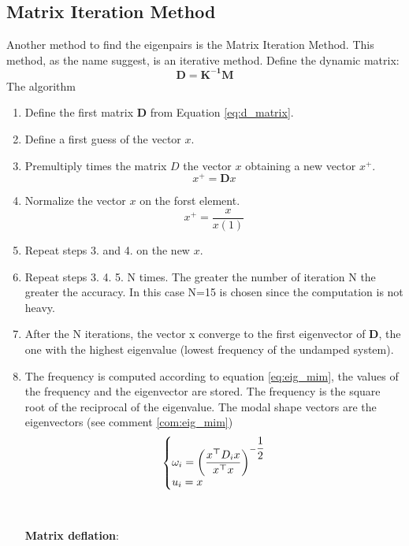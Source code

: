 \documentclass[twosided,a4paper]{article}           %
\makeatletter
\newcounter{comment}[section]
\newcommand{\tr}{^{{\bm \top}}}
\newenvironment{sistema}%
{\left\lbrace\begin{array}{@{}l@{}}}%
	{\end{array}\right.}
\makeatother
\begin{document}
\subsection{Matrix Iteration Method}
	Another method to find the eigenpairs is the Matrix Iteration Method. This method, as the name suggest, is an iterative method.
	Define the dynamic matrix:
	\begin{equation}
	    \label{eq:d_matrix}
		\bm{D} = \bm{K^{-1}}\bm{M}
	\end{equation}
	The algorithm
	\begin{enumerate}
		\item Define the first matrix $\bm{D}$ from Equation \eqref{eq:d_matrix}.
		\item Define a first guess of the vector $x$.
		\item Premultiply times the matrix $D$ the vector $x$ obtaining a new vector $x^+$.
		\begin{equation}
			x^+ = \bm{D}x
		\end{equation}
		\item Normalize the vector $x$ on the forst element.
		\begin{equation}
			x^+ = \dfrac{x}{x(1)}
		\end{equation}
		\item Repeat steps 3. and 4. on the new $x$.
		\item Repeat steps 3. 4. 5. N times. The greater the number of iteration N the greater the accuracy. In this case N=15 is chosen since the computation is not heavy.
		\item After the N iterations, the vector x converge to the first eigenvector of $\bm{D}$, the one with the highest eigenvalue (lowest frequency of the undamped system).
		\item The frequency is computed according to equation \eqref{eq:eig_mim}, the values of the frequency and the eigenvector are stored. The frequency is the square root of the reciprocal of the eigenvalue. The modal shape vectors are the eigenvectors (see comment \ref{com:eig_mim})
		\begin{equation}
		\label{eq:eig_mim}
		\begin{sistema}
			\omega_i = \left (\dfrac{x\tr D_i x}{x\tr x}\right )^{-\dfrac{1}{2}}\\
			u_i = x
		\end{sistema}
		\end{equation}
		\\ \\
	\noindent\textbf{ Matrix deflation}:

\end{enumerate}
\end{document}
